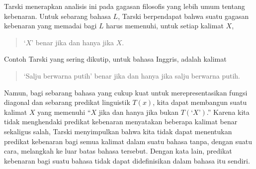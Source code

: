 \documentclass[../../../include/open-logic-section]{subfiles}
\begin{document}
Tarski menerapkan analisis ini pada gagasan filosofis yang lebih umum tentang
kebenaran. Untuk sebarang bahasa $L$, Tarski berpendapat bahwa suatu gagasan
kebenaran yang memadai bagi $L$ harus memenuhi, untuk setiap kalimat $X$,
\begin{quote}
`$X$' benar jika dan hanya jika $X$.
\end{quote}
Contoh Tarski yang sering dikutip, untuk bahasa Inggris, adalah kalimat
\begin{quote}
`Salju berwarna putih' benar jika dan hanya jika salju berwarna putih.
\end{quote}
Namun, bagi sebarang bahasa yang cukup kuat untuk merepresentasikan fungsi
diagonal dan sebarang predikat linguistik $T(x)$, kita dapat membangun suatu
kalimat $X$ yang memenuhi ``$X$ jika dan hanya jika bukan
$T(\text{`$X$'})$.'' Karena kita tidak menghendaki predikat kebenaran
menyatakan beberapa kalimat benar sekaligus salah, Tarski menyimpulkan bahwa
kita tidak dapat menentukan predikat kebenaran bagi semua kalimat dalam
suatu bahasa tanpa, dengan suatu cara, melangkah ke luar batas bahasa
tersebut. Dengan kata lain, predikat kebenaran bagi suatu bahasa tidak dapat
didefinisikan dalam bahasa itu sendiri.
\end{document}
